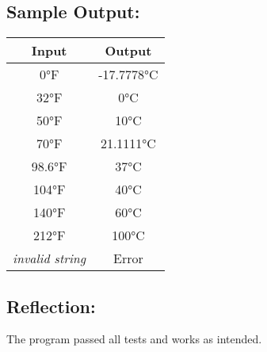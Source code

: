 \documentclass[main.tex]{subfiles}
\begin{document}
        \subsection*{Sample Output:}
            \begin{center}
                \begin{tabular}{c c}
                    \hline
                    \textbf{Input} & \textbf{Output} \\
                    \hline
                    0°F & -17.7778°C \\
                    32°F & 0°C \\
                    50°F & 10°C \\
                    70°F & 21.1111°C \\
                    98.6°F & 37°C \\
                    104°F & 40°C \\
                    140°F & 60°C \\
                    212°F & 100°C \\
                    \textit{invalid string} & Error \\
                    \hline
                \end{tabular}
            \end{center}

        \subsection*{Reflection:}
            The program passed all tests and works as intended.
\end{document}
